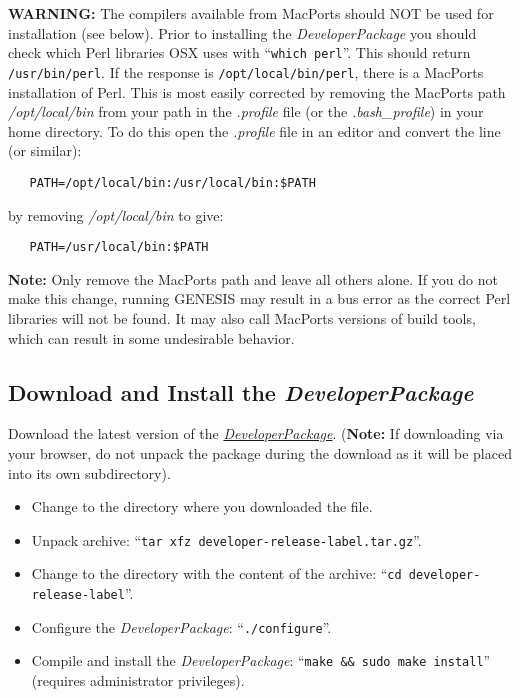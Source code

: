 \documentclass[12pt]{article}
\begin{document}
   {\bf WARNING:} The compilers available from MacPorts should NOT be used for installation (see below). Prior to installing the {\it DeveloperPackage} you should check which Perl libraries OSX uses with ``{\tt  which perl}''. This should return {\tt  /usr/bin/perl}. If the response is {\tt /opt/local/bin/perl}, there is a MacPorts installation of Perl. This is most easily corrected by removing the MacPorts path {\it /opt/local/bin} from your path in the {\it .profile} file (or the {\it .bash\_profile}) in your home directory. To do this open the  {\it .profile} file in an editor and convert the line (or similar):
\begin{verbatim}
   PATH=/opt/local/bin:/usr/local/bin:$PATH
\end{verbatim}
by removing {\it /opt/local/bin} to give:
\begin{verbatim}
   PATH=/usr/local/bin:$PATH
\end{verbatim}
{\bf Note:} Only remove the MacPorts path and leave all others alone. If you do not make this change, running GENESIS may result in a bus error as the correct Perl libraries will not be found. It may also call MacPorts versions of build tools, which can result in some undesirable behavior.  
   
   
\subsection*{Download and Install the {\it DeveloperPackage}}

Download the latest version of the \href{https://github.com/HugoCornelis/developer/blob/master/developer-0.0.0-alpha.tar.gz?raw=true}{{\it DeveloperPackage}}.  ({\bf Note:} If downloading via your browser, do not unpack the package during the download as it will be placed into its own subdirectory).

\begin{itemize}
   \item[] Change to the directory where you downloaded the file.
   \item[] Unpack archive: ``{\tt tar xfz developer-release-label.tar.gz}''.
   \item[] Change to the directory with the content of the archive: ``{\tt cd developer-release-label}''.
   \item[] Configure the {\it DeveloperPackage}: ``{\tt ./configure}''.
   \item[] Compile and install the {\it DeveloperPackage}: ``{\tt make \&\& sudo make install}'' (requires administrator privileges).
\end{itemize}
\end{document}
